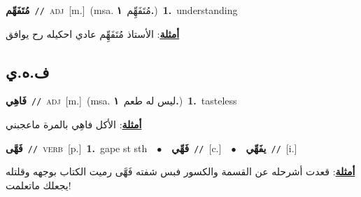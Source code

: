 \documentclass[10pt,a4paper,twoside]{article} %
\begin{document}
\begin{multicols}{2}
{\setlength\topsep{0pt}\textbf{\foreignlanguage{arabic}{مُتَفَهِّم}}\ {\color{gray}\texttt{//}\color{black}}\ \textsc{adj}\ [m.]\ \color{gray}(msa. \foreignlanguage{arabic}{مُتَفَهِِّم}~\foreignlanguage{arabic}{\textbf{١.}})\color{black}\ \textbf{1.}~understanding\  \begin{flushright}\color{gray}\foreignlanguage{arabic}{\textbf{\underline{\foreignlanguage{arabic}{أمثلة}}}: الأستاذ مُتَفَهِِّم عادي احكيله رح يوافق}\end{flushright}\color{black}} \vspace{2mm}

\vspace{-3mm}
\subsection*{\color{blue}\foreignlanguage{arabic}{ف.ه.ي}\color{blue}{}} 

{\setlength\topsep{0pt}\textbf{\foreignlanguage{arabic}{فَاهِي}}\ {\color{gray}\texttt{//}\color{black}}\ \textsc{adj}\ [m.]\ \color{gray}(msa. \foreignlanguage{arabic}{ليس له طعم}~\foreignlanguage{arabic}{\textbf{١.}})\color{black}\ \textbf{1.}~tasteless\  \begin{flushright}\color{gray}\foreignlanguage{arabic}{\textbf{\underline{\foreignlanguage{arabic}{أمثلة}}}: الأكل فاهِي بالمرة ماعجبني}\end{flushright}\color{black}} \vspace{2mm}

{\setlength\topsep{0pt}\textbf{\foreignlanguage{arabic}{فَهَّى}}\ {\color{gray}\texttt{//}\color{black}}\ \textsc{verb}\ [p.]\ \textbf{1.}~gape st sth\ \ $\bullet$\ \ \setlength\topsep{0pt}\textbf{\foreignlanguage{arabic}{فَهِّي}}\ {\color{gray}\texttt{//}\color{black}}\ [c.]\ \ $\bullet$\ \ \setlength\topsep{0pt}\textbf{\foreignlanguage{arabic}{يفَهِّي}}\ {\color{gray}\texttt{//}\color{black}}\ [i.]\  \begin{flushright}\color{gray}\foreignlanguage{arabic}{\textbf{\underline{\foreignlanguage{arabic}{أمثلة}}}: قعدت أشرحله عن القسمة والكسور فبس شفته فَهَّى رميت الكتاب بوجهه وقلتله يجعلك ماتعلمت!}\end{flushright}\color{black}} \vspace{2mm}


\end{multicols}
\end{document}
